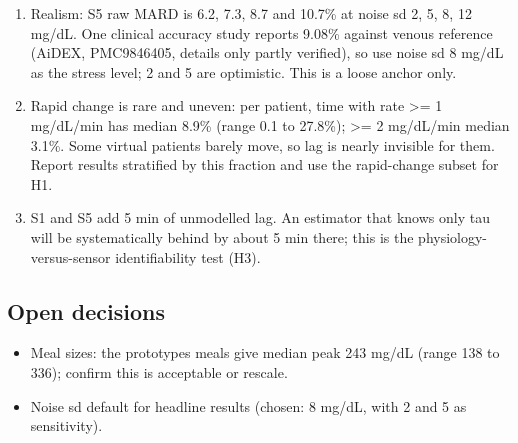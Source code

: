 \documentclass[11pt,a4paper]{article}
\providecommand{\tightlist}{\setlength{\itemsep}{0pt}\setlength{\parskip}{0pt}}
\begin{document}
\begin{enumerate}
\def\labelenumi{\arabic{enumi}.}
\tightlist
\item
  Realism: S5 raw MARD is 6.2, 7.3, 8.7 and 10.7\% at noise sd 2, 5, 8,
  12 mg/dL. One clinical accuracy study reports 9.08\% against venous
  reference (AiDEX, PMC9846405, details only partly verified), so use
  noise sd 8 mg/dL as the stress level; 2 and 5 are optimistic. This is
  a loose anchor only.
\item
  Rapid change is rare and uneven: per patient, time with
  \textbar rate\textbar{} \textgreater= 1 mg/dL/min has median 8.9\%
  (range 0.1 to 27.8\%); \textgreater= 2 mg/dL/min median 3.1\%. Some
  virtual patients barely move, so lag is nearly invisible for them.
  Report results stratified by this fraction and use the rapid-change
  subset for H1.
\item
  S1 and S5 add 5 min of unmodelled lag. An estimator that knows only
  tau will be systematically behind by about 5 min there; this is the
  physiology-versus-sensor identifiability test (H3).
\end{enumerate}

\hypertarget{open-decisions}{%
\subsection{Open decisions}\label{open-decisions}}

\begin{itemize}
\tightlist
\item
  Meal sizes: the prototype\textquotesingle s meals give median peak 243
  mg/dL (range 138 to 336); confirm this is acceptable or rescale.
\item
  Noise sd default for headline results (chosen: 8 mg/dL, with 2 and 5
  as sensitivity).
\end{itemize}
\end{document}

